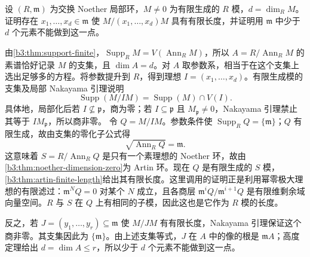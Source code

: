 \begin{exercise}\label{b3:ex:09-module-parameters}
	设 \((R,\mathfrak m)\) 为交换 Noether 局部环，\(M\ne0\) 为有限生成的 \(R\) 模，\(d=\dim_R M\)。 证明存在 \(x_1,\ldots,x_d\in\mathfrak m\) 使 \(M/(x_1,\ldots,x_d)M\) 具有有限长度，并证明用 \(\mathfrak m\) 中少于 \(d\) 个元素不能做到这一点。
\end{exercise}
\begin{solution}
	由\cref{b3:thm:support-finite}，\(\operatorname{Supp}_R M=V(\operatorname{Ann}_R M)\)，所以 \(A=R/\operatorname{Ann}_R M\) 的素谱恰好记录 \(M\) 的支集，且 \(\dim A=d\)。对 \(A\) 取参数系，相当于在这个支集上选出足够多的方程。将参数提升到 \(R\)，得到理想 \(I=(x_1,\ldots,x_d)\)。有限生成模的支集及局部 Nakayama 引理说明
	\[
		\operatorname{Supp}(M/IM)=\operatorname{Supp}(M)\cap V(I).
	\]
	具体地，局部化后若 \(I\not\subseteq\mathfrak p\)，商为零；若 \(I\subseteq\mathfrak p\) 且 \(M_{\mathfrak p}\ne0\)，Nakayama 引理禁止其等于 \(I M_{\mathfrak p}\)，所以商非零。 令 \(Q=M/IM\)。参数条件使 \(\operatorname{Supp}_R Q=\{\mathfrak m\}\)；\(Q\) 有限生成，故由支集的零化子公式得
	\[
		\sqrt{\operatorname{Ann}_R Q}=\mathfrak m.
	\]
	这意味着 \(S=R/\operatorname{Ann}_R Q\) 是只有一个素理想的 Noether 环，故由\cref{b3:thm:noether-dimension-zero}为 Artin 环。现在 \(Q\) 是有限生成的 \(S\) 模，\cref{b3:thm:artin-finite-length}给出其有限长度。这里调用的证明正是利用幂零极大理想的有限滤过：\(\mathfrak m^NQ=0\) 对某个 \(N\) 成立，且各商层 \(\mathfrak m^iQ/\mathfrak m^{i+1}Q\) 是有限维剩余域向量空间。\(R\) 与 \(S\) 在 \(Q\) 上有相同的子模，因此这也是它作为 \(R\) 模的长度。

	反之，若 \(J=(y_1,\ldots,y_r)\subseteq\mathfrak m\) 使 \(M/JM\) 有有限长度，Nakayama 引理保证这个商非零。其支集因此为 \(\{\mathfrak m\}\)。由上述支集等式，\(J\) 在 \(A\) 中的像的根是 \(\mathfrak m A\)；高度定理给出 \(d=\dim A\le r\)，所以少于 \(d\) 个元素不能做到这一点。
\end{solution}

